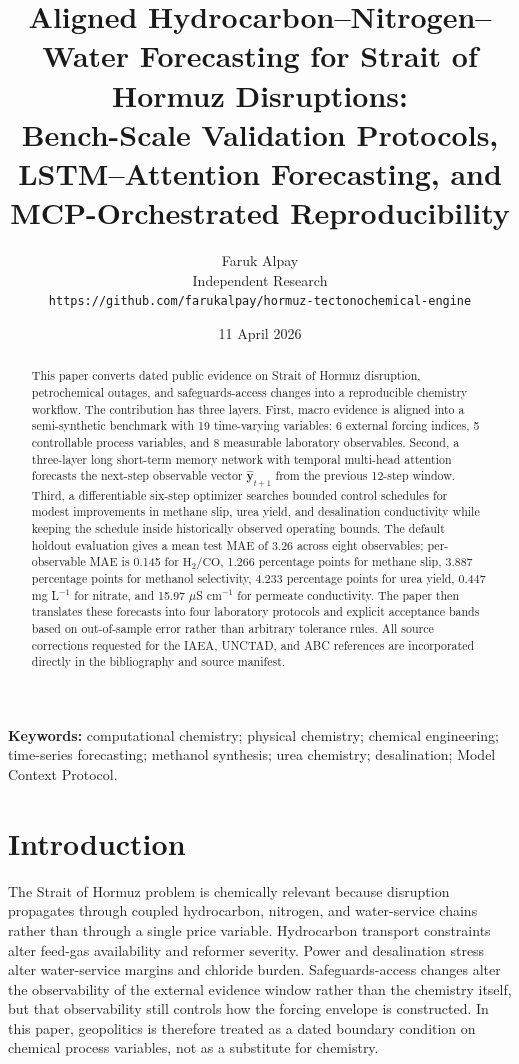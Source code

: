 \documentclass[11pt]{article}
\title{\textbf{Aligned Hydrocarbon--Nitrogen--Water Forecasting for Strait of Hormuz Disruptions:}\\
\textbf{Bench-Scale Validation Protocols, LSTM--Attention Forecasting, and MCP-Orchestrated Reproducibility}}
\author{
Faruk Alpay\\
Independent Research\\
\texttt{https://github.com/farukalpay/hormuz-tectonochemical-engine}
}
\date{11 April 2026}
\begin{document}
\maketitle

\begin{abstract}
This paper converts dated public evidence on Strait of Hormuz disruption, petrochemical outages, and safeguards-access changes into a reproducible chemistry workflow. The contribution has three layers. First, macro evidence is aligned into a semi-synthetic benchmark with 19 time-varying variables: 6 external forcing indices, 5 controllable process variables, and 8 measurable laboratory observables. Second, a three-layer long short-term memory network with temporal multi-head attention forecasts the next-step observable vector \(\hat{\mathbf{y}}_{t+1}\) from the previous 12-step window. Third, a differentiable six-step optimizer searches bounded control schedules for modest improvements in methane slip, urea yield, and desalination conductivity while keeping the schedule inside historically observed operating bounds. The default holdout evaluation gives a mean test MAE of 3.26 across eight observables; per-observable MAE is 0.145 for \(\mathrm{H_2/CO}\), 1.266 percentage points for methane slip, 3.887 percentage points for methanol selectivity, 4.233 percentage points for urea yield, 0.447 mg L\(^{-1}\) for nitrate, and 15.97 \(\mu\)S cm\(^{-1}\) for permeate conductivity. The paper then translates these forecasts into four laboratory protocols and explicit acceptance bands based on out-of-sample error rather than arbitrary tolerance rules. All source corrections requested for the IAEA, UNCTAD, and ABC references are incorporated directly in the bibliography and source manifest.
\end{abstract}

\textbf{Keywords:} computational chemistry; physical chemistry; chemical engineering; time-series forecasting; methanol synthesis; urea chemistry; desalination; Model Context Protocol.

\section{Introduction}

The Strait of Hormuz problem is chemically relevant because disruption propagates through coupled hydrocarbon, nitrogen, and water-service chains rather than through a single price variable. Hydrocarbon transport constraints alter feed-gas availability and reformer severity. Power and desalination stress alter water-service margins and chloride burden. Safeguards-access changes alter the observability of the external evidence window rather than the chemistry itself, but that observability still controls how the forcing envelope is constructed. In this paper, geopolitics is therefore treated as a dated boundary condition on chemical process variables, not as a substitute for chemistry.
\end{document}
